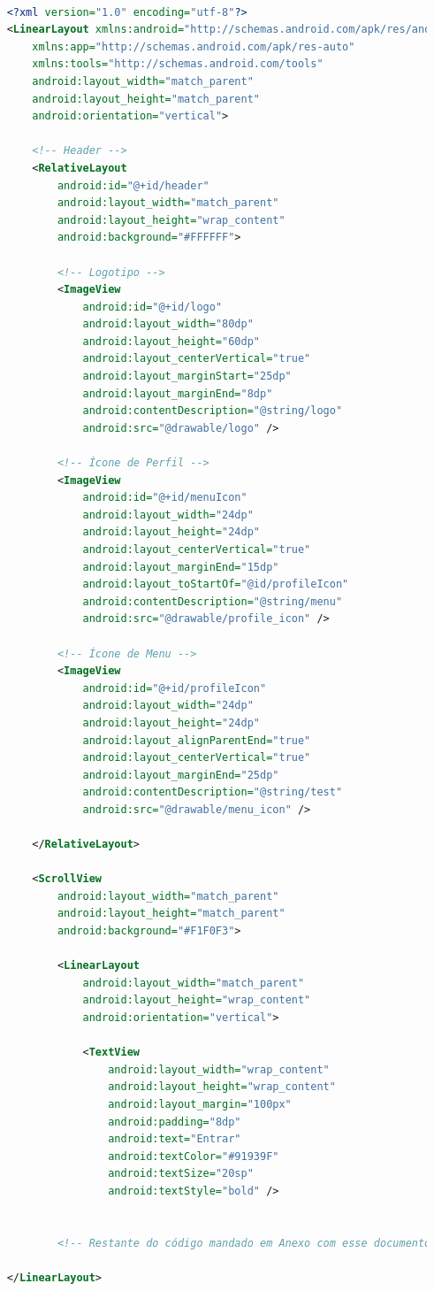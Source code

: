 \documentclass[
	12pt,				%
	openright,			%
	twoside,			%
	a4paper,			%
	english,			%
	brazil				%
	]{abntex2}
\begin{document}
\begin{lstlisting}[language=XML, caption=Código da tela de Login, label=lst:xml]

	<?xml version="1.0" encoding="utf-8"?>
	<LinearLayout xmlns:android="http://schemas.android.com/apk/res/android"
		xmlns:app="http://schemas.android.com/apk/res-auto"
		xmlns:tools="http://schemas.android.com/tools"
		android:layout_width="match_parent"
		android:layout_height="match_parent"
		android:orientation="vertical">
	
		<!-- Header -->
		<RelativeLayout
			android:id="@+id/header"
			android:layout_width="match_parent"
			android:layout_height="wrap_content"
			android:background="#FFFFFF">
	
			<!-- Logotipo -->
			<ImageView
				android:id="@+id/logo"
				android:layout_width="80dp"
				android:layout_height="60dp"
				android:layout_centerVertical="true"
				android:layout_marginStart="25dp"
				android:layout_marginEnd="8dp"
				android:contentDescription="@string/logo"
				android:src="@drawable/logo" />
	
			<!-- Ícone de Perfil -->
			<ImageView
				android:id="@+id/menuIcon"
				android:layout_width="24dp"
				android:layout_height="24dp"
				android:layout_centerVertical="true"
				android:layout_marginEnd="15dp"
				android:layout_toStartOf="@id/profileIcon"
				android:contentDescription="@string/menu"
				android:src="@drawable/profile_icon" />
	
			<!-- Ícone de Menu -->
			<ImageView
				android:id="@+id/profileIcon"
				android:layout_width="24dp"
				android:layout_height="24dp"
				android:layout_alignParentEnd="true"
				android:layout_centerVertical="true"
				android:layout_marginEnd="25dp"
				android:contentDescription="@string/test"
				android:src="@drawable/menu_icon" />
	
		</RelativeLayout>
	
		<ScrollView
			android:layout_width="match_parent"
			android:layout_height="match_parent"
			android:background="#F1F0F3">
	
			<LinearLayout
				android:layout_width="match_parent"
				android:layout_height="wrap_content"
				android:orientation="vertical">
	
				<TextView
					android:layout_width="wrap_content"
					android:layout_height="wrap_content"
					android:layout_margin="100px"
					android:padding="8dp"
					android:text="Entrar"
					android:textColor="#91939F"
					android:textSize="20sp"
					android:textStyle="bold" />
	
					
			<!-- Restante do código mandado em Anexo com esse documento -->
	
	</LinearLayout>


\end{lstlisting}
\end{document}
